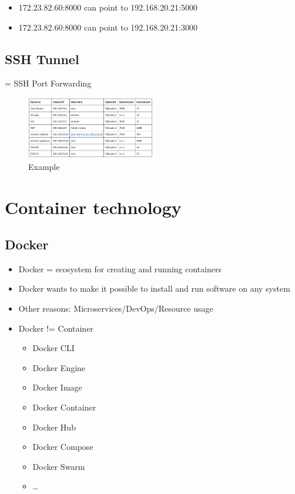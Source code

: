 \documentclass{article}
\begin{document}
\begin{itemize}
    \item 172.23.82.60:8000 can point to 192.168.20.21:5000
    \item 172.23.82.60:8000 can point to 192.168.20.21:3000
\end{itemize}

\subsection{SSH Tunnel}

= SSH Port Forwarding

\begin{figure}[H]
    \centering
    \includegraphics[width=0.5\textwidth]{ssh-tunnel.png}
    \caption{Example}
\end{figure}

\section{Container technology}

\subsection{Docker}

\begin{itemize}
    \item Docker = ecosystem for creating and running containers
    \item Docker wants to make it possible to install and run software on any system
    \item Other reasons: Microservices/DevOps/Resource usage
    \item Docker != Container
    \begin{itemize}
        \item Docker CLI
        \item Docker Engine
        \item Docker Image
        \item Docker Container
        \item Docker Hub
        \item Docker Compose
        \item Docker Swarm
        \item \dots
    \end{itemize}
\end{itemize}
\end{document}
